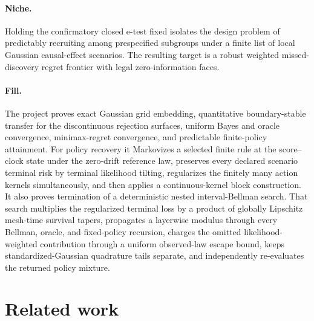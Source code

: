 \documentclass{article}
\begin{document}
\paragraph{Niche.} Holding the confirmatory closed e-test fixed isolates the design problem of predictably recruiting among prespecified subgroups under a finite list of local Gaussian causal-effect scenarios. The resulting target is a robust weighted missed-discovery regret frontier with legal zero-information faces.

\paragraph{Fill.} The project proves exact Gaussian grid embedding, quantitative boundary-stable transfer for the discontinuous rejection surfaces, uniform Bayes and oracle convergence, minimax-regret convergence, and predictable finite-policy attainment. For policy recovery it Markovizes a selected finite rule at the score--clock state under the zero-drift reference law, preserves every declared scenario terminal risk by terminal likelihood tilting, regularizes the finitely many action kernels simultaneously, and then applies a continuous-kernel block construction. It also proves termination of a deterministic nested interval-Bellman search. That search multiplies the regularized terminal loss by a product of globally Lipschitz mesh-time survival tapers, propagates a layerwise modulus through every Bellman, oracle, and fixed-policy recursion, charges the omitted likelihood-weighted contribution through a uniform observed-law escape bound, keeps standardized-Gaussian quadrature tails separate, and independently re-evaluates the returned policy mixture.

\section{Related work}
\end{document}
